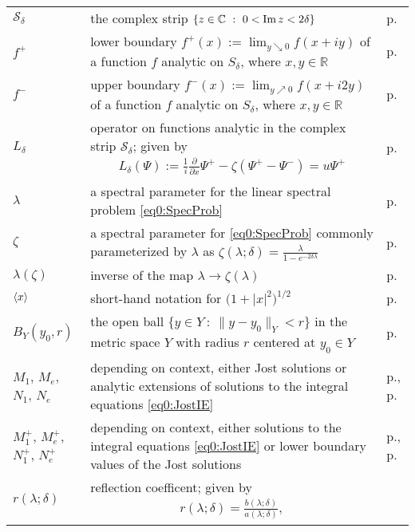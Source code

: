\documentclass[../dissertation.tex]{subfiles}
\begin{document}
\begin{centering}
\begin{longtable}{R{.115\textwidth}|L{.74\textwidth}|C{.145\textwidth}}
	$\mathcal S_\delta$ & the complex strip
			$\{z \in \mathbb C ~:~ 0 < \operatorname{Im} z < 2\delta\}$ 
		& p.\pageref{sym:Sdelta} \\
	$f^+$ & lower boundary $f^+(x) := 
			\lim_{y\searrow0} f(x+ i y)$ of a function $f$ analytic on $S_\delta$,
			where $x, y \in \mathbb R$ 
		& p.\pageref{sym:bndries} \\
	$f^-$ & upper boundary $f^-(x) := \lim_{y\nearrow0} f(x+ i 2y)$ of a 
			function $f$ analytic on $S_\delta$, where $x, y \in \mathbb R$
		& p.\pageref{sym:bndries} \\
	$L_\delta$ & operator on functions analytic in the complex strip 
		$\mathcal S_\delta$; given by 
		{
			\begin{align*}
				L_\delta (\Psi) 
					:= \frac{1}{i} \frac{\partial}{\partial x} \Psi^+ 
					- \zeta \left(\Psi^+ - \Psi^-\right) = u \Psi^+
			\end{align*}
		}
		& p.\pageref{eq0:SpecProb} \\
	$\lambda$ & a spectral parameter for the linear spectral problem 
			\eqref{eq0:SpecProb} 
		& p.\pageref{sym:zeta} \\
	$\zeta$ & a spectral parameter for \eqref{eq0:SpecProb} commonly
			parameterized by $\lambda$	as 
			$\displaystyle \zeta(\lambda; \delta) 
				= \frac{\lambda}{1-e^{-2\delta\lambda}}$ 
		& p.\pageref{sym:zeta} \\
	$\lambda(\zeta)$ &  inverse of the map $\lambda \to \zeta(\lambda)$ 
		& p.\pageref{sym:lambda} \\
	$\left\langle x \right\rangle$ & short-hand notation for $\big(1 + |x|^2\big)^{1/2}$
		& p.\pageref{sym:xbracket} \\
	$B_Y(y_0, r)$ & the open ball $\{ y \in Y ~:~ \|y - y_0\|_Y < r  \}$ in 
		the metric space $Y$ with radius $r$ centered at $y_0 \in Y$
		& p.\pageref{sym:ball} \\	
	$M_1$, $M_e$, $N_1$, $N_e$ & depending on context, either Jost solutions 
		or analytic extensions of solutions to the integral equations
		\eqref{eq0:JostIE}
		& p.\pageref{defn0:jost}, p.\pageref{eq0:JostIE} \\
	$M_1^+$, $M_e^+$, $N_1^+$, $N_e^+$ & depending on context, either solutions
		to the integral equations \eqref{eq0:JostIE} or lower boundary 
		values of the Jost solutions
		& p.\pageref{eq0:JostIE}, p.\pageref{defn0:jost} \\
	$r(\lambda; \delta)$ & reflection coefficent; given by
		{
			\begin{align*}
				r(\lambda; \delta) = \frac{b(\lambda; \delta)}{a(\lambda; \delta)},

\end{align*}}
\end{longtable}
\end{centering}
\end{document}
